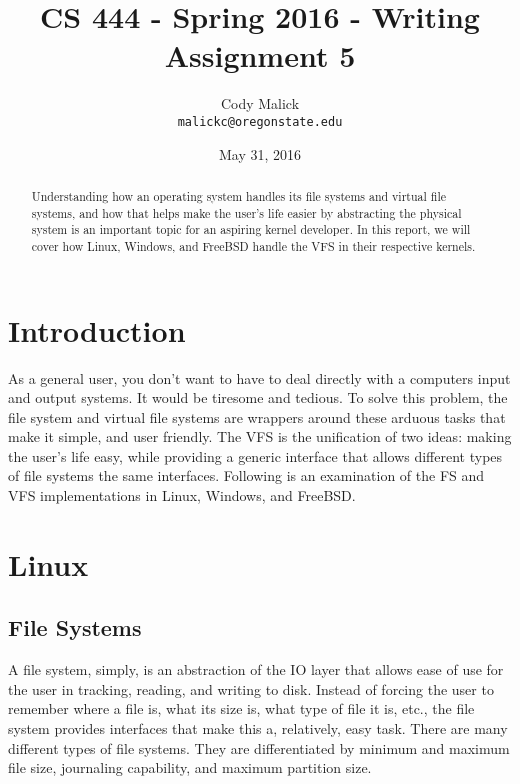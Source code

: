 \documentclass[10pt,letterpaper,onecolumn,draftclsnofoot]{IEEEtran}
\begin{document}
\begin{titlepage}
  \title{CS 444 - Spring 2016 - Writing Assignment 5}
  \author{Cody Malick\\
  \texttt{malickc@oregonstate.edu}}
  \date{May 31, 2016}
  \maketitle
  \vspace*{4cm}
  \begin{abstract}
      \noindent Understanding how an operating system handles its file systems and
      virtual file systems, and how that helps make the user's life easier by abstracting
      the physical system is an important topic for an aspiring kernel developer.
      In this report, we will cover how Linux, Windows, and FreeBSD handle the
      VFS in their respective kernels.
  \end{abstract}
\end{titlepage}

\tableofcontents
\clearpage
\section{Introduction}
As a general user, you don't want to have to deal directly with a computers
input and output systems. It would be tiresome and tedious. To solve this
problem, the file system and virtual file systems are wrappers around these
arduous tasks that make it simple, and user friendly. The VFS is the unification
of two ideas: making the user's life easy, while providing a generic interface
that allows different types of file systems the same interfaces. Following is
an examination of the FS and VFS implementations in Linux, Windows, and FreeBSD. 
\section{Linux}
  \subsection{File Systems}
  A file system, simply, is an abstraction of the IO layer that allows ease of
  use for the user in tracking, reading, and writing to disk. Instead of forcing
  the user to remember where a file is, what its size is, what type of file it
  is, etc., the file system provides interfaces that make this a, relatively,
  easy task. There are many different types of file systems. They are 
  differentiated by minimum and maximum file size, journaling capability, and
  maximum partition size. 
\end{document}
